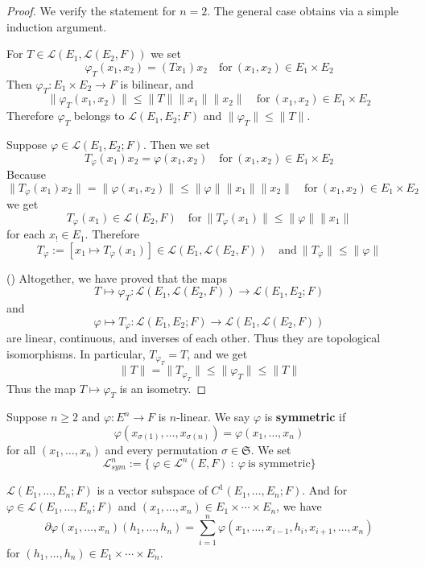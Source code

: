 \begin{proof}
We verify the statement for $n=2$. The general case obtains via a simple induction argument.\par
For $T\in\mathcal{L}(E_1,\mathcal{L}(E_2,F))$ we set
\[\varphi_T(x_1,x_2)=(Tx_1)x_2\quad\text{for}\ (x_1,x_2)\in E_1\times E_2\]
Then $\varphi_T: E_1\times E_2 \to F$ is bilinear, and
\[\|\varphi_T(x_1,x_2)\|\leq\|T\|\|x_1\|\|x_2\|\quad\text{for}\ (x_1,x_2)\in E_1\times E_2\]
 Therefore $\varphi_T$ belongs to $\mathcal{L}(E_1,E_2;F)$ and $\|\varphi_T\|\leq\|T\|$.\par
Suppose $\varphi\in\mathcal{L}(E_1,E_2;F)$. Then we set
\[T_\varphi(x_1)x_2=\varphi(x_1,x_2)\quad\text{for}\ (x_1,x_2)\in E_1\times E_2\]
Because 
\[\|T_\varphi(x_1)x_2\|=\|\varphi(x_1,x_2)\|\leq\|\varphi\|\|x_1\|\|x_2\|\quad\text{for}\ (x_1,x_2)\in E_1\times E_2\]
we get
\[T_\varphi(x_1)\in\mathcal{L}(E_2,F)\quad\text{for}\ \|T_\varphi(x_1)\|\leq \|\varphi\|\|x_1\|\]
for each $x_!\in E_1$. Therefore
\[T_\varphi:=[x_1\mapsto T_\varphi(x_1)]\in\mathcal{L}(E_1,\mathcal{L}(E_2,F))\quad\text{and}\ \|T_\varphi\|\leq\|\varphi\|\]
\item[(\rmnum{3})]Altogether, we have proved that the maps
\[T\mapsto\varphi_T:\mathcal{L}(E_1,\mathcal{L}(E_2,F))\to\mathcal{L}(E_1,E_2;F)\]
and
\[\varphi\mapsto T_\varphi:\mathcal{L}(E_1,E_2;F)\to\mathcal{L}(E_1,\mathcal{L}(E_2,F))\]
are linear, continuous, and inverses of each other. Thus they are topological isomorphisms.
In particular, $T_{\varphi_T}=T$, and we get
\[\|T\|=\|T_{\varphi_T}\|\leq\|\varphi_T\|\leq \|T\|\]
Thus the map $T\mapsto\varphi_T$ is an isometry.
\end{proof}
\begin{definition}
Suppose $n\geq2$ and $\varphi:E^n\to F$ is $n$-linear. We say $\varphi$ is \textbf{symmetric} if
\[\varphi(x_{\sigma(1)},\dots,x_{\sigma(n)})=\varphi(x_1,\dots,x_n)\]
for all $(x_1,\dots,x_n)$ and every permutation $\sigma\in\mathfrak{S}$. We set 
\[\mathcal{L}^n_{sym}:=\{\ \varphi\in\mathcal{L}^n(E,F)\ :\  \varphi\ \text{is symmetric}\}\]
\end{definition}
\begin{proposition}\label{Diff Mult.5}
$\mathcal{L}(E_1,\dots,E_n;F)$ is a vector subspace of $C^1(E_1,\dots,E_n;F)$. And for $\varphi\in\mathcal{L}(E_1,\dots,E_n;F)$ and $(x_1,\dots,x_n)\in E_1\times\cdots\times E_n$, we have
\[\partial \varphi(x_1,\dots,x_n)(h_1,\dots,h_n)=\sum_{i=1}^{n}\varphi(x_1,\dots,x_{i-1},h_i,x_{i+1},\dots,x_n)\]
for $(h_1,\dots,h_n)\in E_1\times\cdots\times E_n$.
\end{proposition}

